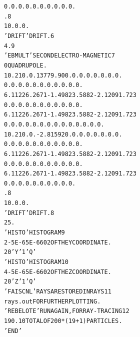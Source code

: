 \begin{tiny}
\begin{center}
\begin{alltt}
  0.  0. 0. 0. 0. 0. 0. 0. 0. 0.                                                 
  .8                                                                             
  1 0. 0. 0.                                                                     
  'DRIFT'                                       DRIFT.                    6      
  4.9                                                                            
  'EBMULT'                                      SECOND ELECTRO-MAGNETIC    7      
   0                                                             QUADRUPOLE.     
  10.2  10. 0.  13779.90  0. 0. 0. 0. 0. 0. 0. 0.                                
   0.  0.  0.  0.  0.  0.  0. 0. 0. 0. 0.                                        
  6  .1122 6.2671 -1.4982 3.5882 -2.1209 1.723                                   
   0.  0.  0.  0.  0.  0.  0. 0. 0. 0. 0.                                        
  6  .1122 6.2671 -1.4982 3.5882 -2.1209 1.723                                   
  0. 0. 0. 0. 0. 0. 0. 0. 0. 0. 0. 0. 0. 0.                                      
  10.2  10. 0.   -2.81592  0. 0. 0. 0. 0. 0. 0. 0.                               
   0.  0.  0.  0.  0.  0.  0. 0. 0. 0. 0.                                        
  6  .1122 6.2671 -1.4982 3.5882 -2.1209 1.723                                   
   0.  0.  0.  0.  0.  0.  0. 0. 0. 0. 0.                                        
  6  .1122 6.2671 -1.4982 3.5882 -2.1209 1.723                                   
  0. 0. 0. 0. 0. 0. 0. 0. 0. 0.                                                  
  .8                                                                             
  1 0. 0. 0.                                                                     
  'DRIFT'                                       DRIFT.                    8      
  25.                                                                            
  'HISTO'                                       HISTOGRAM                 9      
  2  -5E-6  5E-6     60  2                        OF THE Y COORDINATE.           
  20  'Y'  1  'Q'                                                                
  'HISTO'                                       HISTOGRAM                10      
  4  -5E-6  5E-6     60  2                        OF THE Z COORDINATE.           
  20  'Z'  1  'Q'                                                                
  'FAISCNL'                                     RAYS ARE STORED IN RAYS  11      
  rays.out                                               FOR FURTHER PLOTTING.   
  'REBELOTE'                                    RUN AGAIN, FOR RAY-TRACING  12      
  19  0.1 0                                       TOTAL OF 200*(19+1) PARTICLES. 
  'END'                                                                          



\end{alltt}
\end{center}
\end{tiny}
